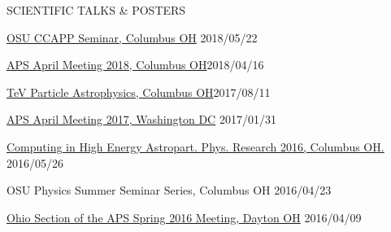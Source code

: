 \documentclass{resume} %
\begin{document}
\begin{rSection}{SCIENTIFIC TALKS \& POSTERS}
\begin{etaremune}
\item \href{http://ccapp.osu.edu/pastseminars.html#past}{OSU CCAPP Seminar, Columbus OH} \hfill 2018/05/22
\item \href{http://meetings.aps.org/Meeting/APR18/Session/U17.7}{APS April Meeting 2018, Columbus OH}\hfill 2018/04/16
\item \href{http://indico.cern.ch/event/615891/contributions/2648790/}{TeV Particle Astrophysics, Columbus OH}\hfill 2017/08/11
\item \href{http://meetings.aps.org/Meeting/APR17/Session/Y3.2}{APS April Meeting 2017, Washington DC} \hfill 2017/01/31
\item \href{http://ccapp.osu.edu/workshops/CHEAPR2016/workshop.html}{Computing in High Energy Astropart. Phys. Research 2016, Columbus OH.} \hfill 2016/05/26
\item OSU Physics Summer Seminar Series, Columbus OH \hfill 2016/04/23
\item \href{http://meetings.aps.org/Meeting/OSS16/Session/D3.6}{Ohio Section of the APS Spring 2016 Meeting, Dayton OH} \hfill 2016/04/09

\end{etaremune}
\end{rSection}
\newpage
\end{document}
